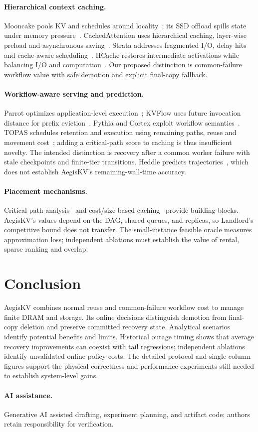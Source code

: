 \documentclass[sigplan,10pt,anonymous,nonacm]{acmart}
\begin{document}
\paragraph{Hierarchical context caching.}
Mooncake pools KV and schedules around locality~\cite{qin2025mooncake};
its SSD offload spills state under memory pressure~\cite{mooncake2026ssdoffload}.
CachedAttention uses hierarchical caching, layer-wise preload and
asynchronous saving~\cite{gao2024cachedattention}. Strata addresses
fragmented I/O, delay hits and cache-aware scheduling~\cite{xie2026strata}.
HCache restores intermediate activations while balancing I/O and
computation~\cite{gao2025hcache}. Our proposed distinction is common-failure workflow value
with safe demotion and explicit final-copy fallback.

\paragraph{Workflow-aware serving and prediction.}
Parrot optimizes application-level execution~\cite{lin2024parrot}; KVFlow
uses future invocation distance for prefix eviction~\cite{pan2025kvflow}.
Pythia and Cortex exploit workflow semantics~\cite{yu2026pythia,pagonas2025cortex}.
TOPAS schedules retention and execution using remaining paths, reuse and
movement cost~\cite{ni2026topas}; adding a critical-path score to caching
is thus insufficient novelty. The intended distinction is recovery after
a common worker failure with stale checkpoints and finite-tier transitions.
Heddle predicts trajectories~\cite{zhang2026heddle}, which does not establish
AegisKV's remaining-wall-time accuracy.

\paragraph{Placement mechanisms.}
Critical-path analysis~\cite{kelley1959cpm} and cost/size-based caching~\cite{young2002landlord}
provide building blocks. AegisKV's values depend on the DAG, shared queues,
and replicas, so Landlord's competitive bound does not transfer. The
small-instance feasible oracle measures approximation loss; independent
ablations must establish the value of rental, sparse ranking and overlap.

\section{Conclusion}
\label{sec:conclusion}

AegisKV combines normal reuse and common-failure workflow cost to manage
finite DRAM and storage. Its online decisions distinguish demotion from
final-copy deletion and preserve committed recovery state. Analytical
scenarios identify potential benefits and limits. Historical outage timing
shows that average recovery improvements can coexist with tail regressions;
independent ablations identify unvalidated online-policy costs. The detailed
protocol and single-column figures support the physical correctness and performance
experiments still needed to establish system-level gains.

\paragraph{AI assistance.}
Generative AI assisted drafting, experiment planning, and artifact code;
authors retain responsibility for verification.



\end{document}
